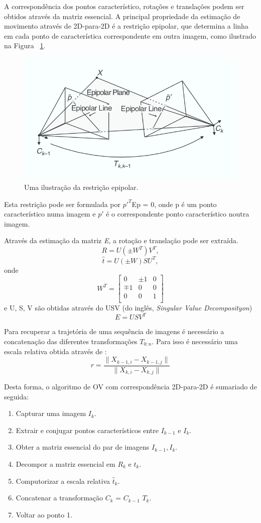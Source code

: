 A correspondência dos pontos característico, rotações e translações podem ser obtidos através da matriz essencial. A principal propriedade da estimação de movimento através de 2D-para-2D é a restrição epipolar, que determina a linha em cada ponto de característica correspondente em outra imagem, como ilustrado na Figura ~\ref{fig:epipolarconstrait}.

\begin{figure}[h!]
	\centering
	\includegraphics[width=0.7\linewidth]{figures/equipolarline}
	\caption{Uma ilustração da restrição epipolar. \cite{VOpart1}}
	\label{fig:epipolarconstrait}
\end{figure}

Esta restrição pode ser formulada por $p'^{T}$Ep = 0, onde p é um ponto característico numa imagem e $p'$ é o correspondente ponto característico noutra imagem.

Através da estimação da matriz \textit{E}, a rotação e translação pode ser extraída. 
\[ R = U(\pm W^T)V^T,\] \[ \hat{t} =  U(\pm W)SU^T, \] 
onde \[  W^T = \left[\begin{array}{ccc}0&\pm1&0\\\mp1&0&0\\0&0&1\\\end{array}\right] \] 
e U, S, V são obtidas através do USV (do inglês, \textit{Singular Value Decomposityon}) \[ E = USV^T \]

Para recuperar a trajetória de uma sequência de imagens é necessário a concatenação das diferentes transformações \textit{$T_{0:n}$}. Para isso é necessário uma escala relativa obtida através de : \[ r = \frac{ \| X_{k-1,i} - X_{k-1,j} \| }{ \| X_{k,i} - X_{k,j} \| } \] 

Desta forma, o algoritmo de OV com correspondência 2D-para-2D é sumariado de seguida:
\begin{enumerate}
	\item Capturar uma imagem \textit{$I_{k}$}.
	\item Extrair e conjugar pontos característicos entre \textit{$I_{k-1}$} e \textit{$I_{k}$}.
	\item Obter a matriz essencial do par de imagens \textit{$I_{k-1},I_k$}.
	\item Decompor a matriz essencial em \textit{$R_k$} e \textit{$\hat{t}_k$}.
	\item Computorizar a escala relativa \textit{$\hat{t}_k$}.
	\item Concatenar a transformação $C_k$ = $C_{k-1}$ $T_k$.
	\item Voltar ao ponto 1.
\end{enumerate}


